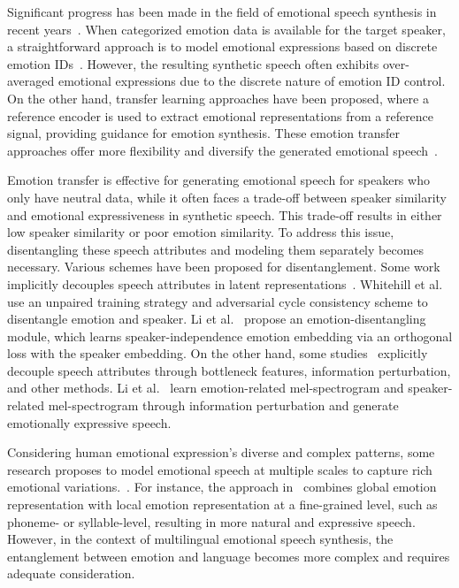 \documentclass[journal,comsoc]{IEEEtran}
\begin{document}
Significant progress has been made in the field of emotional speech synthesis in recent years~\cite{DBLP:journals/corr/abs-2206-14866,DBLP:journals/taslp/LeiYWX22,DBLP:journals/taslp/LiWXWX22,DBLP:journals/corr/abs-2110-04153}. When categorized emotion data is available for the target speaker, a straightforward approach is to model emotional expressions based on discrete emotion IDs~\cite{DBLP:conf/apsipa/AnLD17,DBLP:journals/corr/abs-1711-05447}. However, the resulting synthetic speech often exhibits over-averaged emotional expressions due to the discrete nature of emotion ID control. On the other hand, transfer learning approaches have been proposed, where a reference encoder is used to extract emotional representations from a reference signal, providing guidance for emotion synthesis. These emotion transfer approaches offer more flexibility and diversify the generated emotional speech~\cite{DBLP:conf/icml/Skerry-RyanBXWS18,DBLP:conf/interspeech/AkuzawaIM18,DBLP:conf/iscslp/LiYXX21}.

Emotion transfer is effective for generating emotional speech for speakers who only have neutral data, while it often faces a trade-off between speaker similarity and emotional expressiveness in synthetic speech. This trade-off results in either low speaker similarity or poor emotion similarity. To address this issue, disentangling these speech attributes and modeling them separately becomes necessary. Various schemes have been proposed for disentanglement. Some work implicitly decouples speech attributes in latent representations~\cite{DBLP:conf/interspeech/WangDYCLM21,DBLP:conf/interspeech/WangLZ0KM21}. Whitehill et al.~\cite{DBLP:conf/interspeech/WhitehillMMS20} use an unpaired training strategy and adversarial
cycle consistency scheme to disentangle emotion and speaker.  Li et al.~\cite{DBLP:journals/taslp/LiWXWX22} propose an emotion-disentangling module, which learns speaker-independence emotion embedding via an orthogonal loss with the speaker embedding. On the other hand, some studies~\cite{DBLP:conf/nips/ChoiLKLHL21,DBLP:conf/icassp/ChanQZH22} explicitly decouple speech attributes through bottleneck features, information perturbation, and other methods. Li et al.~\cite{DBLP:journals/spl/LeiYZXS22} learn emotion-related mel-spectrogram and speaker-related mel-spectrogram through information perturbation and generate emotionally expressive speech.



Considering human emotional expression's diverse and complex patterns, some research proposes to model emotional speech at multiple scales to capture rich emotional variations.~\cite{DBLP:journals/taslp/LeiYWX22,DBLP:journals/corr/abs-2205-07211,DBLP:journals/corr/abs-2210-15834}. For instance, the approach in~\cite{DBLP:journals/taslp/LeiYWX22} combines global emotion representation with local emotion representation at a fine-grained level, such as phoneme- or syllable-level, resulting in more natural and expressive speech. However, in the context of multilingual emotional speech synthesis, the entanglement between emotion and language becomes more complex and requires adequate consideration.
\end{document}
